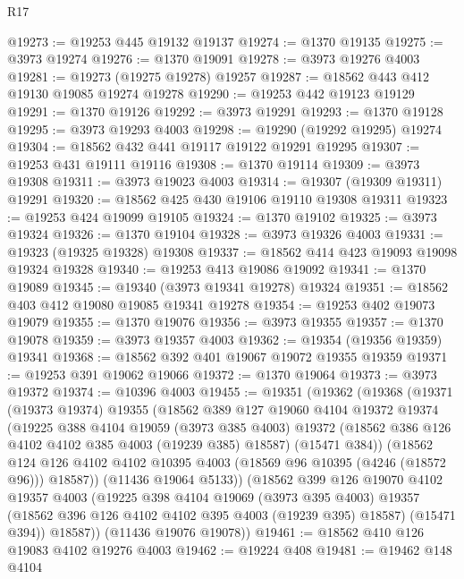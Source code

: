 \begin{lexlean}{R17}
\begin{coremodule}
@19273 := @19253 @445 @19132 @19137
@19274 := @1370 @19135
@19275 := @3973 @19274
@19276 := @1370 @19091
@19278 := @3973 @19276 @4003
@19281 := @19273 (@19275 @19278) @19257
@19287 := @18562 @443 @412 @19130 @19085 @19274 @19278
@19290 := @19253 @442 @19123 @19129
@19291 := @1370 @19126
@19292 := @3973 @19291
@19293 := @1370 @19128
@19295 := @3973 @19293 @4003
@19298 := @19290 (@19292 @19295) @19274
@19304 := @18562 @432 @441 @19117 @19122 @19291 @19295
@19307 := @19253 @431 @19111 @19116
@19308 := @1370 @19114
@19309 := @3973 @19308
@19311 := @3973 @19023 @4003
@19314 := @19307 (@19309 @19311) @19291
@19320 := @18562 @425 @430 @19106 @19110 @19308 @19311
@19323 := @19253 @424 @19099 @19105
@19324 := @1370 @19102
@19325 := @3973 @19324
@19326 := @1370 @19104
@19328 := @3973 @19326 @4003
@19331 := @19323 (@19325 @19328) @19308
@19337 := @18562 @414 @423 @19093 @19098 @19324 @19328
@19340 := @19253 @413 @19086 @19092
@19341 := @1370 @19089
@19345 := @19340 (@3973 @19341 @19278) @19324
@19351 := @18562 @403 @412 @19080 @19085 @19341 @19278
@19354 := @19253 @402 @19073 @19079
@19355 := @1370 @19076
@19356 := @3973 @19355
@19357 := @1370 @19078
@19359 := @3973 @19357 @4003
@19362 := @19354 (@19356 @19359) @19341
@19368 := @18562 @392 @401 @19067 @19072 @19355 @19359
@19371 := @19253 @391 @19062 @19066
@19372 := @1370 @19064
@19373 := @3973 @19372
@19374 := @10396 @4003
@19455 := @19351
    (@19362
      (@19368
        (@19371
          (@19373 @19374)
          @19355
          (@18562
            @389
            @127
            @19060
            @4104
            @19372
            @19374
            (@19225
              @388
              @4104
              @19059
              (@3973 @385 @4003)
              @19372
              (@18562 @386 @126 @4102 @4102 @385 @4003 (@19239 @385) @18587)
              (@15471 @384))
            (@18562
              @124
              @126
              @4102
              @4102
              @10395
              @4003
              (@18569 @96 @10395 (@4246 (@18572 @96)))
              @18587))
          (@11436 @19064 @5133))
        (@18562
          @399
          @126
          @19070
          @4102
          @19357
          @4003
          (@19225
            @398
            @4104
            @19069
            (@3973 @395 @4003)
            @19357
            (@18562 @396 @126 @4102 @4102 @395 @4003 (@19239 @395) @18587)
            (@15471 @394))
          @18587))
      (@11436 @19076 @19078))
@19461 := @18562 @410 @126 @19083 @4102 @19276 @4003
@19462 := @19224 @408
@19481 := @19462
    @148
    @4104

\end{coremodule}
\end{lexlean}
